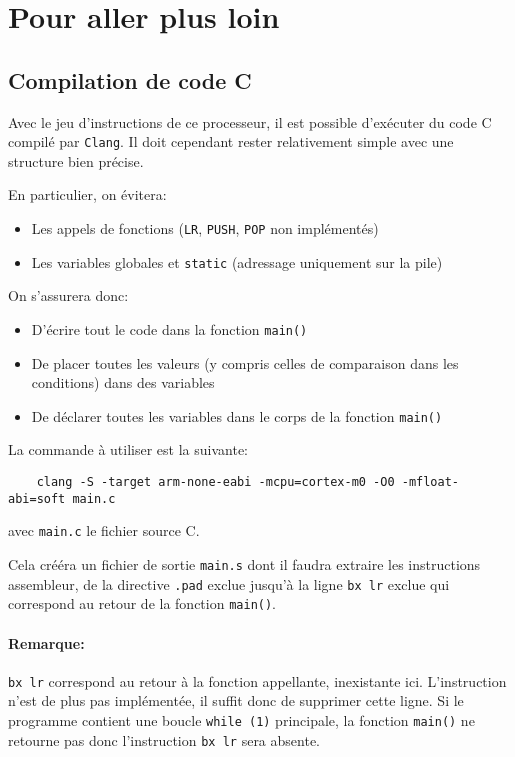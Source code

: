 \documentclass{article}
\begin{document}
    \section{Pour aller plus loin}

    \subsection{Compilation de code C}
    Avec le jeu d'instructions de ce processeur, il est possible d'exécuter du code C compilé par \texttt{Clang}.
    Il doit cependant rester relativement simple avec une structure bien précise.

    En particulier, on évitera:
    \begin{itemize}
        \item Les appels de fonctions (\texttt{LR}, \texttt{PUSH}, \texttt{POP} non implémentés)
        \item Les variables globales et \texttt{static} (adressage uniquement sur la pile)
    \end{itemize}

    On s'assurera donc:
    \begin{itemize}
        \item D'écrire tout le code dans la fonction \texttt{main()}
        \item De placer toutes les valeurs (y compris celles de comparaison dans les conditions) dans des variables
        \item De déclarer toutes les variables dans le corps de la fonction \texttt{main()}
    \end{itemize}

    La commande à utiliser est la suivante:
    \begin{lstlisting}
	clang -S -target arm-none-eabi -mcpu=cortex-m0 -O0 -mfloat-abi=soft main.c
    \end{lstlisting}
    avec \texttt{main.c} le fichier source C.

    Cela crééra un fichier de sortie \texttt{main.s} dont il faudra extraire les instructions assembleur,
    de la directive \texttt{.pad} exclue jusqu'à la ligne \texttt{bx lr} exclue qui correspond au retour de la fonction \texttt{main()}.

    \paragraph{Remarque:} \texttt{bx lr} correspond au retour à la fonction appellante, inexistante ici.
    L'instruction n'est de plus pas implémentée, il suffit donc de supprimer cette ligne.
    Si le programme contient une boucle \texttt{while (1)} principale, la fonction \texttt{main()} ne retourne pas donc l'instruction \texttt{bx lr} sera absente.
\end{document}
